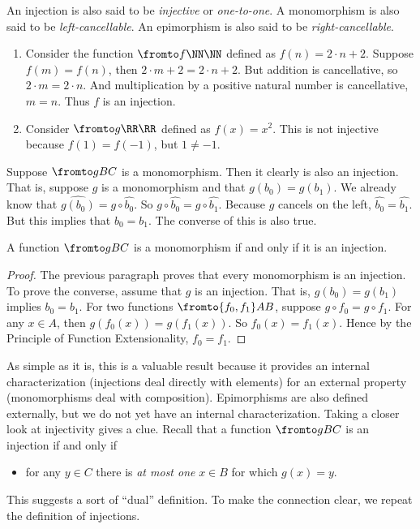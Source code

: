 An injection is also said to be \emph{injective} or \emph{one-to-one}.
A monomorphism is also said to be \emph{left-cancellable}. 
An epimorphism is also said to be \emph{right-cancellable}.

\printbreak
\begin{example}
	\begin{enumerate}
		\item Consider the function $\fromto f\NN\NN$ defined as $f(n) = 2\cdot n  + 2$.
		Suppose $f(m)=f(n)$, then $2\cdot m + 2=2\cdot n+ 2$. 
		But addition is cancellative, so $2\cdot m=2\cdot n$. 
		And multiplication by a positive natural number is cancellative, $m=n$.
		Thus $f$ is an injection.
		\item Consider $\fromto g\RR\RR$ defined as $f(x) = x^2$. 
		This is not injective because $f(1)=f(-1)$, but $1\neq -1$. 
	\end{enumerate}
\end{example}

Suppose $\fromto gBC$ is a monomorphism. 
Then it clearly is also an injection. 
That is, suppose $g$ is a monomorphism and that $g(b_0)=g(b_1)$. 
We already know that $\widehat{g(b_0)} = g\circ \widehat{b_0}$.
So $g\circ \widehat{b_0} = g\circ \widehat{b_1}$.
Because $g$ cancels on the left, $\widehat{b_0} = \widehat{b_1}$.
But this implies that $b_0=b_1$.
The converse of this is also true.

\begin{lemma}
	A function $\fromto gBC$ is a monomorphism if and only if it is an injection.
	\begin{proof}
		The previous paragraph proves that every monomorphism is an injection. To prove the converse, assume that $g$ is an injection. 
		That is, $g(b_0)=g(b_1)$ implies $b_0=b_1$.
		For two functions $\fromto {f_0,f_1}AB$, suppose $g\circ f_0=g\circ f_1$. 
		For any $x\in A$, then $g(f_0(x)) = g(f_1(x))$. So $f_0(x)=f_1(x)$. Hence by the Principle of Function Extensionality, $f_0=f_1$.
	\end{proof}
\end{lemma}

As simple as it is, this is a valuable result because it provides an internal characterization (injections deal directly with elements) for an external property (monomorphisms deal with composition). Epimorphisms are also defined externally, but we do not yet have an internal characterization. Taking a closer look at injectivity gives a clue.
Recall that a function $\fromto gBC$ is an injection if and only if
\begin{itemize}
	\item for any $y\in C$ there is \emph{at most one} $x\in B$ for which $g(x)=y$.
\end{itemize}
This suggests a sort of ``dual'' definition. To make the connection clear, we repeat the definition of injections.

